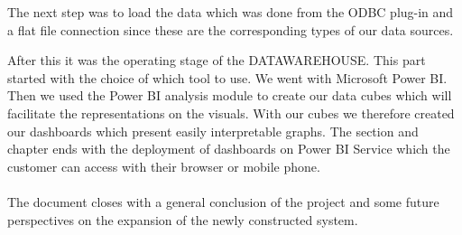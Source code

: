 The next step was to load the data which was done from the ODBC plug-in and a flat file connection since these are the corresponding types of our data sources.

After this it was the operating stage of the DATAWAREHOUSE. This part started with the choice of which tool to use. We went with Microsoft Power BI. Then we used the Power BI analysis module to create our data cubes which will facilitate the representations on the visuals. With our cubes we therefore created our dashboards which present easily interpretable graphs. The section and chapter ends with the deployment of dashboards on Power BI Service which the customer can access with their browser or mobile phone.


\paragraph{}
The document closes with a general conclusion of the project and some future perspectives on the expansion of the newly constructed system.

